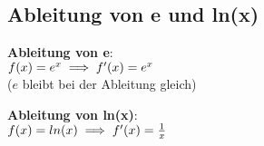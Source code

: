 \subsection{Ableitung von e und ln(x)}
\label{sec:ableiten}
\begin{multicols}{2}
\textbf{Ableitung von e}: \\
$f(x) = e^x \\
\implies f'(x) = e^x$ \\
($e$ bleibt bei der Ableitung gleich) 

\columnbreak

\textbf{Ableitung von ln(x)}: \\
$
f(x) = ln(x) \\
\implies f'(x) = \frac{1}{x}
$
\end{multicols}
